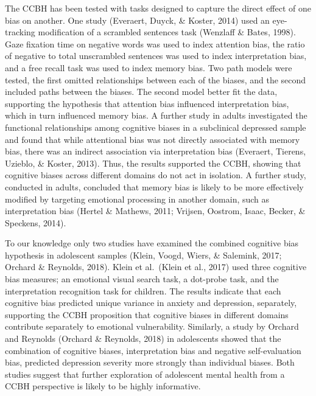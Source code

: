 \documentclass[man,floatsintext]{apa6}
\begin{document}
The CCBH has been tested with tasks designed to capture the direct effect of one bias on another. One study (Everaert, Duyck, \& Koster, 2014) used an eye-tracking modification of a scrambled sentences task (Wenzlaff \& Bates, 1998). Gaze fixation time on negative words was used to index attention bias, the ratio of negative to total unscrambled sentences was used to index interpretation bias, and a free recall task was used to index memory bias. Two path models were tested, the first omitted relationships between each of the biases, and the second included paths between the biases. The second model better fit the data, supporting the hypothesis that attention bias influenced interpretation bias, which in turn influenced memory bias. A further study in adults investigated the functional relationships among cognitive biases in a subclinical depressed sample and found that while attentional bias was not directly associated with memory bias, there was an indirect association via interpretation bias (Everaert, Tierens, Uzieblo, \& Koster, 2013). Thus, the results supported the CCBH, showing that cognitive biases across different domains do not act in isolation. A further study, conducted in adults, concluded that memory bias is likely to be more effectively modified by targeting emotional processing in another domain, such as interpretation bias (Hertel \& Mathews, 2011; Vrijsen, Oostrom, Isaac, Becker, \& Speckens, 2014).

To our knowledge only two studies have examined the combined cognitive bias hypothesis in adolescent samples (Klein, Voogd, Wiers, \& Salemink, 2017; Orchard \& Reynolds, 2018). Klein et al.~(Klein et al., 2017) used three cognitive bias measures; an emotional visual search task, a dot-probe task, and the interpretation recognition task for children. The results indicate that each cognitive bias predicted unique variance in anxiety and depression, separately, supporting the CCBH proposition that cognitive biases in different domains contribute separately to emotional vulnerability. Similarly, a study by Orchard and Reynolds (Orchard \& Reynolds, 2018) in adolescents showed that the combination of cognitive biases, interpretation bias and negative self-evaluation bias, predicted depression severity more strongly than individual biases. Both studies suggest that further exploration of adolescent mental health from a CCBH perspective is likely to be highly informative.
\end{document}
